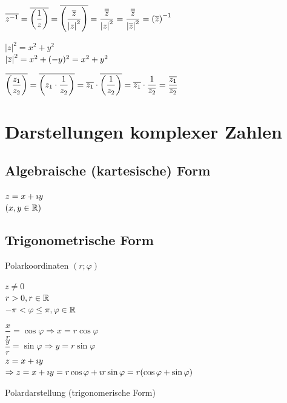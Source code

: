 
\Beweis 
$\overline{{z}^{-1}}=\overline{\left(\dfrac{1}{z}\right)}=\overline{\left(\dfrac{\overline{z}}{{|z|}^2}\right)}=\dfrac{\overline{\overline{z}}}{{|z|}^2}=\dfrac{\overline{\overline{z}}}{{|\overline{z}|}^2}={(\overline{z})}^{-1}$

${|z|}^2 = x^2+y^2$\\
${|\overline{z}|}^2 = x^2+(-y)^2 = x^2+y^2$

\Bem $\overline{\left(\dfrac{z_1}{z_2}\right)}=\overline{\left(z_1\cdot\dfrac{1}{z_2}\right)}=\overline{z_1}\cdot\overline{\left(\dfrac{1}{z_2}\right)}=\overline{z_1}\cdot\dfrac{1}{\overline{z_2}}=\dfrac{\overline{z_1}}{\overline{z_2}}$

\clearpage
\section{Darstellungen komplexer Zahlen}
\subsection{Algebraische (kartesische) Form}

$z=x+\imath y$\\
$(x,y \in \mathbb{R})$


\clearpage
\subsection{Trigonometrische Form}

Polarkoordinaten $(r;\varphi)$


$z\neq 0$\\
$r>0, r\in\mathbb{R}$\\
$-\pi<\varphi\leq\pi, \varphi\in\mathbb{R}$

$\dfrac{x}{r} = \cos\varphi \Rightarrow x= r\cos\varphi$\\
$\dfrac{y}{r} = \sin\varphi \Rightarrow y= r\sin\varphi$\\
$z=x+\imath y$\\
$\Rightarrow z = x+\imath y = r\cos\varphi + \imath  r\sin\varphi = r(\cos\varphi+\sin\varphi)$

Polardarstellung (trigonomerische Form)\\

